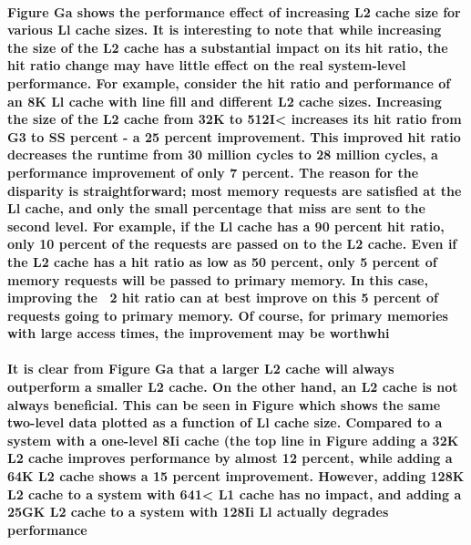 \documentclass{article}
\begin{document}
\paragraph{Figure Ga shows the performance effect of increasing
 L2 cache size for various Ll cache sizes. It is interesting to 
 note that while increasing the size of the L2 cache has a substantial
  impact on its hit ratio, the hit ratio change may have little effect 
  on the real system-level performance. For example, consider the hit
   ratio and performance of an 8K Ll cache with line fill and
    different L2 cache sizes. Increasing the size of the L2 cache
     from 32K to 512I< increases its hit ratio from G3 to SS percent -
      a 25 percent improvement. This improved hit ratio decreases the 
      runtime from 30 million cycles to 28 million cycles, a performance
       improvement of only 7 percent. The reason for the disparity is 
       straightforward; most memory requests are satisfied at the Ll cache,
        and only the small percentage that miss are sent to the second level.
         For example, if the Ll cache has a 90 percent hit ratio, only 10 
         percent of the requests are passed on to the L2 cache. Even if the
          L2 cache has a hit ratio as low as 50 percent, only 5 percent of
           memory requests will be passed to primary memory. In this case, 
           improving the ~2 hit ratio can at best improve on this 5 percent 
           of requests going to primary memory. Of course, for primary memories
            with large access times, the improvement may be worthwhi}

\paragraph{It is clear from Figure Ga that a larger L2 cache will always
outperform a smaller L2 cache. On the other hand, an L2 cache is not
 always beneficial. This can be seen in Figure  which shows the same 
 two-level data plotted as a function of Ll cache size. Compared to a 
 system with a one-level 8Ii cache (the top line in Figure  adding a 
 32K L2 cache improves performance by almost 12 percent, while adding a
  64K L2 cache shows a 15 percent improvement. However, adding 128K L2
   cache to a system with 641< L1 cache has no impact, and adding a 25GK 
   L2 cache to a system with 128Ii Ll actually degrades performance}
\end{document}
